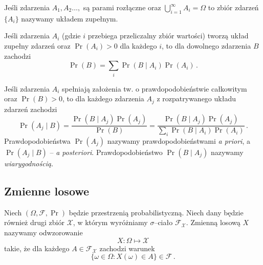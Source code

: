 \documentclass{myclass}
\numberwithin{equation}{subsection}
\begin{document}
\begin{definition}
Jeśli zdarzenia \(A_1,A_2\ldots,\) są parami rozłączne oraz \(\bigcup_{i=1}^\infty A_i = \Omega\) to
zbiór zdarzeń \(\{A_i\}\) nazywamy układem zupełnym.
    
\end{definition}

\begin{theorem}
Jeśli zdarzenia \(A_i\) (gdzie \(i\) przebiega przeliczalny zbiór wartości) tworzą układ zupełny
zdarzeń oraz \(\Pr(A_i) > 0\) dla każdego \(i\), to dla dowolnego zdarzenia \(B\) zachodzi
\begin{equation*}
    \Pr(B) = \sum_{i} \Pr(B \mid A_i) \Pr(A_i)\,.
\end{equation*}
\end{theorem}

\begin{theorem}[Bayesa]
Jeśli zdarzenia \(A_i\) spełniają założenia tw. o prawdopodobieństwie całkowitym oraz \(\Pr(B) >
0\), to dla każdego zdarzenia \(A_j\) z rozpatrywanego układu zdarzeń zachodzi
\begin{equation*}
    \Pr(A_j \mid B) = \frac{\Pr(B \mid A_j) \Pr(A_j)}{\Pr(B)} = \frac{\Pr(B \mid A_j) \Pr(A_j)}{\sum_{i} \Pr(B \mid A_i) \Pr(A_i)}\,.
\end{equation*}
Prawdopodobieństwa \(\Pr(A_j)\) nazywamy prawdopodobieństwami \emph{a priori}, a \(\Pr(A_j \mid B)\)
-- \emph{a posteriori}. Prawdopodobieństwo \(\Pr(B \mid A_j)\) nazywamy \emph{wiarygodnością}.   
\end{theorem}


\subsection{Zmienne losowe}

\begin{definition}
Niech \((\Omega, \mathcal{F}, \Pr)\) będzie przestrzenią probabilistyczną. Niech dany będzie również
drugi zbiór \(\mathcal{X}\), w którym wyróżniamy \(\sigma\)--ciało \(\mathcal{F}_\mathcal{X}\).
Zmienną losową \(X\) nazywamy odwzorowanie
\begin{equation*}
    X: \Omega \mapsto \mathcal{X}
\end{equation*}
takie, że dla każdego \(A \in \mathcal{F}_\mathcal{X}\) zachodzi warunek
\begin{equation*}
    \{\omega \in \Omega : X(\omega) \in A \} \in \mathcal{F}\,.
\end{equation*}
\end{definition}
\end{document}
